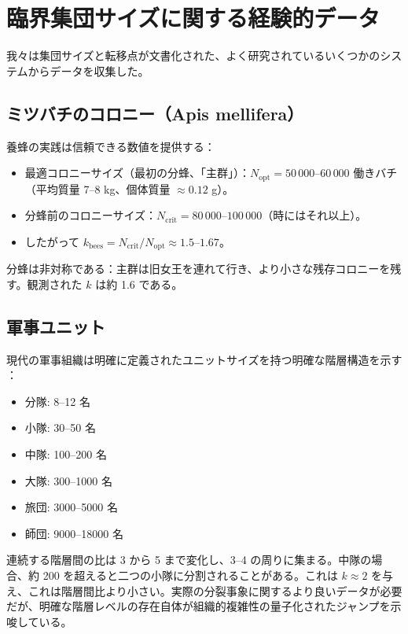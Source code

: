 \documentclass[12pt]{article}
\theoremstyle{remark}
\begin{document}
	\section{臨界集団サイズに関する経験的データ}
	\label{sec:data}
	
	我々は集団サイズと転移点が文書化された、よく研究されているいくつかのシステムからデータを収集した。
	
	\subsection{ミツバチのコロニー（Apis mellifera）}
	\label{subsec:bees}
	
	養蜂の実践は信頼できる数値を提供する：
	\begin{itemize}
		\item 最適コロニーサイズ（最初の分蜂、「主群」）：\(N_{\text{opt}} = 50\,000\)–\(60\,000\) 働きバチ（平均質量 7–8 kg、個体質量 \(\approx 0.12\) g）。\cite{Seeley2010, Winston1987}
		\item 分蜂前のコロニーサイズ：\(N_{\text{crit}} = 80\,000\)–\(100\,000\)（時にはそれ以上）。\cite{bees}
		\item したがって \(k_{\text{bees}} = N_{\text{crit}}/N_{\text{opt}} \approx 1.5\)–\(1.67\)。
	\end{itemize}
	分蜂は非対称である：主群は旧女王を連れて行き、より小さな残存コロニーを残す。観測された \(k\) は約 1.6 である。
	
	\subsection{軍事ユニット}
	\label{subsec:military}
	
	現代の軍事組織は明確に定義されたユニットサイズを持つ明確な階層構造を示す \cite{FM3-90.5}：
	\begin{itemize}
		\item 分隊: 8–12 名
		\item 小隊: 30–50 名
		\item 中隊: 100–200 名
		\item 大隊: 300–1000 名
		\item 旅団: 3000–5000 名
		\item 師団: 9000–18000 名
	\end{itemize}
	連続する階層間の比は 3 から 5 まで変化し、3–4 の周りに集まる。中隊の場合、約 200 を超えると二つの小隊に分割されることがある。これは \(k \approx 2\) を与え、これは階層間比より小さい。実際の分裂事象に関するより良いデータが必要だが、明確な階層レベルの存在自体が組織的複雑性の量子化されたジャンプを示唆している。
	
\end{document}
